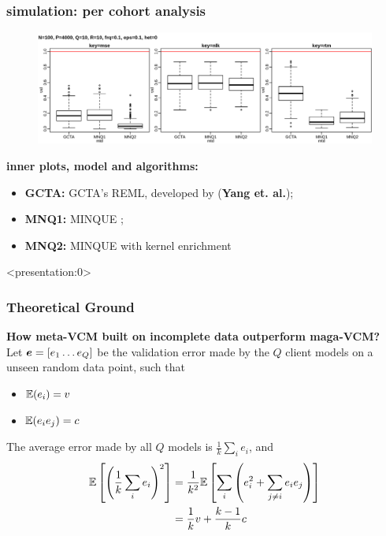 \documentclass{beamer}
\begin{document}
\begin{frame} \frametitle{simulation: per cohort analysis}
  \begin{figure}
    \centering \includegraphics[width=.95\linewidth]{img/vcm_ply_mnq}
  \end{figure}
  {\color{blue}\textbf{inner plots, model and algorithms:}}
  \begin{itemize}
  \item \textbf{GCTA:} GCTA's REML, developed by (\textbf{Yang et. al.});
  \item \textbf{MNQ1:} MINQUE ;
  \item \textbf{MNQ2:} MINQUE with kernel enrichment
  \end{itemize}
\end{frame}
\begin{frame} <presentation:0> %
  \frametitle{Theoretical Ground} %
  \textbf{How meta-VCM built on incomplete data outperform maga-VCM?} \\
  Let ${\bm{e}}=[e_1 \dots e_Q]$ be the validation error made by the $Q$
  client models on a unseen random data point, such that
  \begin{itemize}
  \item $\mathbb{E}(e_i) = v$
  \item $\mathbb{E}(e_i e_j) = c$
  \end{itemize}
  The average error made by all $Q$ models is $\frac{1}{k}\sum_i e_i$,
  and
  \begin{align} \label{eq:beg} \mathbb{E}\left[ \left(\frac{1}{k}\sum_i
        e_i\right)^2 \right]
    &= \frac{1}{k^2}\mathbb{E}\left[\sum_i \left(e_i^2 + \sum_{j \ne i}e_ie_j \right)  \right] \\
    &= \frac{1}{k}v + \frac{k-1}{k}c
  \end{align}
\end{frame}
\end{document}
